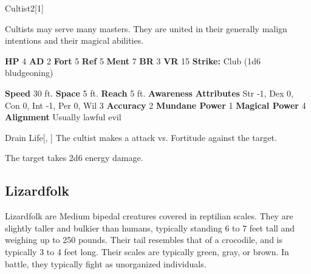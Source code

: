   \begin{monsection}{Cultist}{2}[1]
    \vspace{-1em}\vspace{-1em}
    \vspace{0em}

    
        Cultists may serve many masters.
        They are united in their generally malign intentions and their magical abilities.
      

    \begin{spellcontent}
      \begin{spelltargetinginfo}
        \pari \textbf{HP} 4 \monsep
          \textbf{AD} 2 \monsep
          \textbf{Fort} 5 \monsep
          \textbf{Ref} 5 \monsep
          \textbf{Ment} 7
        \pari \textbf{BR} 3 \monsep
        \textbf{VR} 15
        \pari \textbf{Strike:}
            Club  (1d6 bludgeoning)
      \end{spelltargetinginfo}
    \end{spellcontent}
    \begin{monsterfooter}
      \pari \textbf{Speed} 30 ft. \monsep
        \textbf{Space} 5 ft. \monsep
        \textbf{Reach} 5 ft.
      \pari \textbf{Awareness} 
      \pari \textbf{Attributes}
        Str -1, Dex 0,
        Con 0, Int -1,
        Per 0, Wil 3
      \pari \textbf{Accuracy} 2 \monsep
        \textbf{Mundane Power} 1 \monsep
      \textbf{Magical Power} 4
      \pari \textbf{Alignment} Usually lawful evil
    \end{monsterfooter}
  \end{monsection}
  \begin{freeability}{Drain Life}[, ]
       The cultist makes a  attack
        vs. Fortitude against the target.
    
    \hit The target takes 2d6 energy damage.
    \end{freeability}
  
    \subsection{Lizardfolk}
      
      Lizardfolk are Medium bipedal creatures covered in reptilian scales.
      They are slightly taller and bulkier than humans, typically standing 6 to 7 feet tall and weighing up to 250 pounds.
      Their tail resembles that of a crocodile, and is typically 3 to 4 feet long.
      Their scales are typically green, gray, or brown.
      In battle, they typically fight as unorganized individuals.
    
